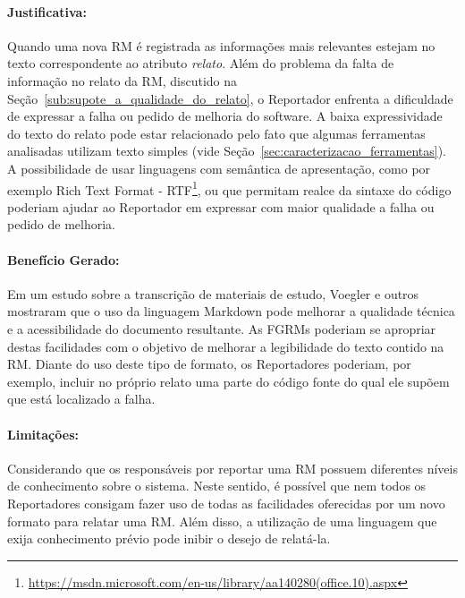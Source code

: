 \paragraph{Justificativa:}
\label{par:justificativa_s06}

Quando uma nova RM é registrada as informações mais relevantes estejam no texto
correspondente ao atributo \textit{relato}. Além do problema da falta de
informação no relato da RM, discutido na
Seção~\ref{sub:supote_a_qualidade_do_relato}, o Reportador enfrenta a
dificuldade de expressar a falha ou pedido de melhoria do software. A baixa
expressividade do texto do relato pode estar relacionado pelo fato que algumas
ferramentas analisadas utilizam texto simples (vide
Seção~\ref{sec:caracterizacao_ferramentas}). A possibilidade de usar linguagens
com semântica de apresentação, como por exemplo Rich Text Format \@-\@
RTF\footnote{\url{https://msdn.microsoft.com/en-us/library/aa140280(office.10).aspx}},
ou que permitam realce da sintaxe do código poderiam ajudar ao Reportador em
expressar com maior qualidade a falha ou pedido de melhoria.

\paragraph{Benefício Gerado:}
\label{par:papéis_afetados_s06}

Em um estudo sobre a transcrição de materiais de estudo, Voegler e
outros~\cite{voegler2014markdown} mostraram que o uso da linguagem Markdown pode
melhorar a qualidade técnica e a acessibilidade do documento resultante. As
FGRMs poderiam se apropriar destas facilidades com o objetivo de melhorar a
legibilidade do texto contido na RM\@. Diante do uso deste tipo de formato, os
Reportadores poderiam, por exemplo, incluir no próprio relato uma parte do
código fonte do qual ele supõem que está localizado a falha.

\paragraph{Limitações:}
\label{par:limitacoes_s06}

Considerando que os responsáveis por reportar uma RM possuem diferentes níveis
de conhecimento sobre o sistema. Neste sentido, é possível que nem todos os
Reportadores consigam fazer uso de todas as facilidades oferecidas por um novo
formato para relatar uma RM\@. Além disso, a utilização de uma linguagem que
exija conhecimento prévio pode inibir o desejo de relatá-la.

